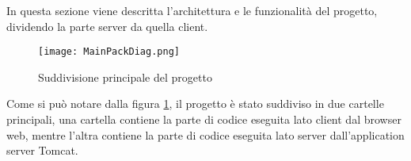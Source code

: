 In questa sezione viene descritta l'architettura e le funzionalità del progetto, dividendo la parte server da quella client.
\begin{figure}[!htb]
\centering%
\texttt{[image: MainPackDiag.png]}%
\caption{Suddivisione principale del progetto}\label{fig:umlPackDiag}%
\end{figure}

Come si può notare dalla figura \ref{fig:umlPackDiag}, il progetto è stato suddiviso in due cartelle principali, una cartella contiene la parte di codice eseguita lato client dal browser web, mentre 
l’altra contiene la parte di codice eseguita lato server dall’application server Tomcat.